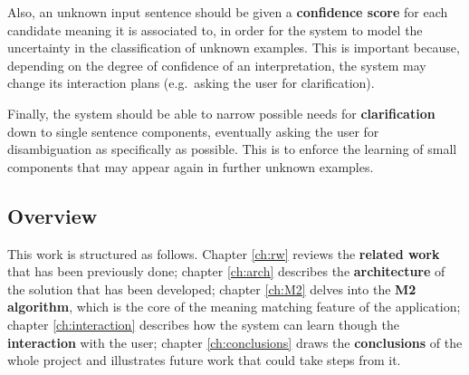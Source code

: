 Also, an unknown input sentence should be given a \textbf{confidence score} for each candidate meaning it is associated to, in order for the system to model the uncertainty in the classification of unknown examples. This is important because, depending on the degree of confidence of an interpretation, the system may change its interaction plans (e.g.\ asking the user for clarification).

Finally, the system should be able to narrow possible needs for \textbf{clarification} down to single sentence components, eventually asking the user for disambiguation as specifically as possible. This is to enforce the learning of small components that may appear again in further unknown examples.

\subsection{Overview}

This work is structured as follows. Chapter \ref{ch:rw} reviews the \textbf{related work} that has been previously done; chapter \ref{ch:arch} describes the \textbf{architecture} of the solution that has been developed; chapter \ref{ch:M2} delves into the \textbf{M2 algorithm}, which is the core of the meaning matching feature of the application; chapter \ref{ch:interaction} describes how the system can learn though the \textbf{interaction} with the user; chapter \ref{ch:conclusions} draws the \textbf{conclusions} of the whole project and illustrates future work that could take steps from it.
